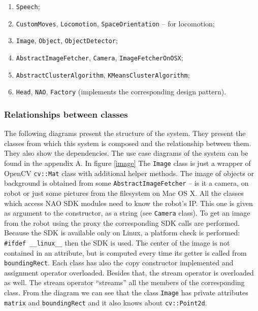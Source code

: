        \begin{enumerate}[topsep=3pt, partopsep=0pt,itemsep=1pt,parsep=1pt]
            \item \verb|Speech|;
            \item \verb|CustomMoves|, \verb|Locomotion|, \verb|SpaceOrientation| -- for locomotion;
            \item \verb|Image|, \verb|Object|, \verb|ObjectDetector|;
            \item \verb|AbstractImageFetcher|, \verb|Camera|, \verb|ImageFetcherOnOSX|;
            \item \verb|AbstractClusterAlgorithm|, \verb|KMeansClusterAlgorithm|;
            \item \verb|Head|, \verb|NAO|, \verb|Factory| (implements the corresponding design pattern).
        \end{enumerate}\itemsep0pt


    \subsubsection{Relationships between classes}
        The following diagrams present the structure of the system. They present the classes from which this system is composed and the relationship between them. They also show the dependencies. The use case diagrams of the system can be found in the appendix A.    
        In figure \ref{image} The \verb|Image| class is just a wrapper of OpenCV \verb|cv::Mat| class with additional helper methods. The image of objects or background is obtained from some \verb|AbstractImageFetcher| -- is it a camera, on robot or just some pictures from the filesystem on Mac OS X. All the classes which access NAO SDK modules need to know the robot's IP. This one is given as argument to the constructor, as a string (see \verb|Camera| class). To get an image from the robot using the proxy the corresponding SDK calls are performed. Because the SDK is available only on Linux, a platform check is performed: \verb|#ifdef __linux__| then the SDK is used. The center of the image is not contained in an attribute, but is computed every time its getter is called from \verb|boundingRect|. Each class has also the copy constructor implemented and assignment operator overloaded. Besides that, the stream operator is overloaded as well. The stream operator ``streams'' all the members of the corresponding class. From the diagram we can see that the class \verb|Image| has private attributes \verb|matrix| and \verb|boundingRect| and it also knows about \verb|cv::Point2d|.
         


